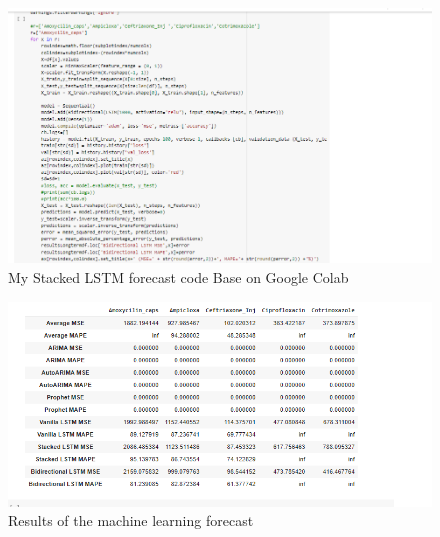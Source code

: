 \documentclass[12pt]{report}
\begin{document}
\begin{figure}[H]%
  \begin {center}
  \includegraphics[width=1\textwidth]{images/StackedLSTM.PNG}
  \caption{My Stacked LSTM forecast code Base on Google Colab}
  \label{fig:ecg}
  \end {center}
\end{figure}


\begin{figure}[H]%
  \begin {center}
  \includegraphics[width=1\textwidth]{images/MSEresults.PNG}
  \caption{Results of the machine learning forecast}
  \label{fig:ecg}
  \end {center}
\end{figure}
\end{document}
